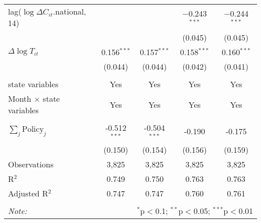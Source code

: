 \begin{tabular}{@{\extracolsep{1pt}}lcccc}
  lag($\log \Delta C_{it}$.national, 14) &  &  & $-$0.243$^{***}$ & $-$0.244$^{***}$ \\ 
  &  &  & (0.045) & (0.045) \\ 
  $\Delta \log T_{it}$ & 0.156$^{***}$ & 0.157$^{***}$ & 0.158$^{***}$ & 0.160$^{***}$ \\ 
  & (0.044) & (0.044) & (0.042) & (0.041) \\ 
 \hline \\[-1.8ex] 
state variables & Yes & Yes & Yes & Yes \\ 
Month $\times$ state variables & Yes & Yes & Yes & Yes \\ 
\hline \\[-1.8ex] 
$\sum_j \mathrm{Policy}_j$ & -0.512$^{***}$ & -0.504$^{***}$ & -0.190 & -0.175 \\ 
 & (0.150) & (0.154) & (0.156) & (0.159) \\ 
Observations & 3,825 & 3,825 & 3,825 & 3,825 \\ 
R$^{2}$ & 0.749 & 0.750 & 0.763 & 0.763 \\ 
Adjusted R$^{2}$ & 0.747 & 0.747 & 0.760 & 0.761 \\ 
\hline 
\hline \\[-1.8ex] 
\textit{Note:}  & \multicolumn{4}{r}{$^{*}$p$<$0.1; $^{**}$p$<$0.05; $^{***}$p$<$0.01} \\ 
\end{tabular} 